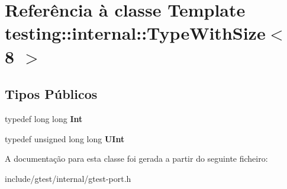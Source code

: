 \hypertarget{classtesting_1_1internal_1_1TypeWithSize_3_018_01_4}{\section{Referência à classe Template testing\-:\-:internal\-:\-:Type\-With\-Size$<$ 8 $>$}
\label{classtesting_1_1internal_1_1TypeWithSize_3_018_01_4}
}
\subsection*{Tipos Públicos}
\begin{DoxyCompactItemize}
\item 
\hypertarget{classtesting_1_1internal_1_1TypeWithSize_3_018_01_4_a36d5697e5f5254b0495f13c97d747e36}{typedef long long {\bfseries Int}}\label{classtesting_1_1internal_1_1TypeWithSize_3_018_01_4_a36d5697e5f5254b0495f13c97d747e36}

\item 
\hypertarget{classtesting_1_1internal_1_1TypeWithSize_3_018_01_4_a747e21c5aee8faf07ec65cd4c3d1ca62}{typedef unsigned long long {\bfseries U\-Int}}\label{classtesting_1_1internal_1_1TypeWithSize_3_018_01_4_a747e21c5aee8faf07ec65cd4c3d1ca62}

\end{DoxyCompactItemize}


A documentação para esta classe foi gerada a partir do seguinte ficheiro\-:\begin{DoxyCompactItemize}
\item 
include/gtest/internal/gtest-\/port.\-h\end{DoxyCompactItemize}
